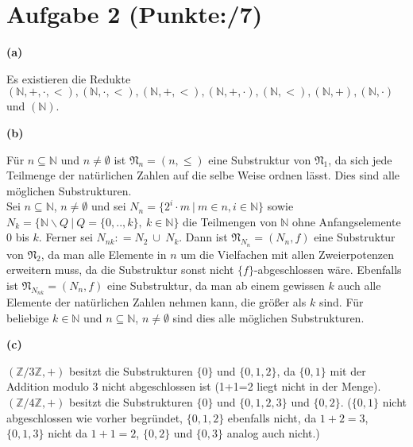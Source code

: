 \documentclass[11pt, a4paper]{article}
\newcommand{\p}{7}
\newcommand{\defgr}{\mathrel{\mathop:\!\!=}}
\begin{document}
\section*{Aufgabe 2 (Punkte:\qquad/\p)}
\textbf{(a)}
\begin{adjustwidth}{20pt}{20pt}
	Es existieren die Redukte $(\mathbb{N},+,\cdot,<), (\mathbb{N},\cdot,<), (\mathbb{N},+,<), (\mathbb{N},+,\cdot), (\mathbb{N},<),
	(\mathbb{N},+), (\mathbb{N},\cdot)$ und $(\mathbb{N})$.
\end{adjustwidth}
\textbf{(b)}
\begin{adjustwidth}{20pt}{20pt}
	Für $n \subseteq \mathbb{N}$ und $n \neq \emptyset$ ist $\mathfrak{N}_n=(n,\leq)$ eine Substruktur von $\mathfrak{N}_1$, da sich jede Teilmenge der natürlichen Zahlen	
	auf die selbe Weise ordnen lässt. Dies sind alle möglichen Substrukturen.\\
	Sei $n \subseteq \mathbb{N}$, $n \neq \emptyset$ und sei $N_n=\{ 2^i \cdot m\ |\ m \in n, i \in \mathbb{N}\}$ sowie $N_k=\{ \mathbb{N}\backslash Q \ | \ Q = \{0,..,k\}, \ k \in \mathbb{N}\}$ die Teilmengen von $\mathbb{N}$ ohne Anfangselemente $0$ bis $k$. Ferner sei $N_{nk} \defgr N_2 \ \cup \ N_k$. Dann ist $\mathfrak{N}_{N_n}=(N_n, f)$ eine Substruktur
	von $\mathfrak{N}_2$, da man alle Elemente in $n$ um die Vielfachen mit allen Zweierpotenzen erweitern muss, da die Substruktur sonst nicht $\{ f \}$-abgeschlossen wäre. Ebenfalls ist $\mathfrak{N}_{N_{nk}}=(N_n, f)$
	eine Substruktur, da man ab einem gewissen $k$ auch alle Elemente der natürlichen Zahlen nehmen kann, die größer als $k$ sind. Für beliebige $k\in \mathbb{N}$ und $n \subseteq \mathbb{N}$, $n \neq \emptyset$
	sind dies alle möglichen Substrukturen.
\end{adjustwidth}
\textbf{(c)}
\begin{adjustwidth}{20pt}{20pt}
	$(\mathbb{Z}/3\mathbb{Z},+)$ besitzt die Substrukturen $\{0\}$ und $\{ 0,1,2 \}$, da $\{ 0,1 \}$ mit der Addition modulo 3 nicht abgeschlossen ist (1+1=2 liegt nicht in der Menge). \\
	$(\mathbb{Z}/4\mathbb{Z},+)$ besitzt die Substrukturen $\{0\}$ und $\{ 0,1,2,3 \}$ und $\{ 0,2 \}$. ($\{ 0,1\}$ nicht abgeschlossen wie vorher begründet, $\{ 0,1,2\}$ ebenfalls
	nicht, da $1+2=3$, $\{ 0,1,3\}$ nicht da $1+1=2$, $\{ 0,2\}$ und $\{ 0,3\}$ analog auch nicht.)
\end{adjustwidth}
\end{document}
